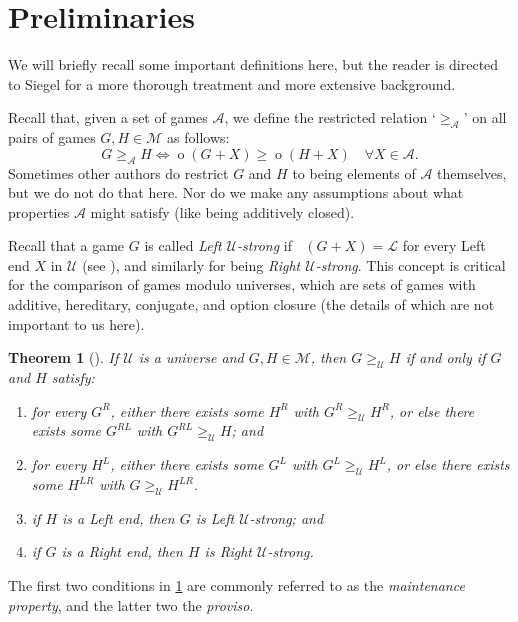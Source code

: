 \documentclass[11pt]{article}
\newtheorem{theorem}{Theorem}[section]
\theoremstyle{definition}
\DeclareMathOperator{\outcome}{o}
\DeclareMathOperator{\outcomeL}{o_L}
\newcommand{\set}[1]{\mathcal{#1}}
\begin{document}
\section{Preliminaries}
\label{sec:prelims}

We will briefly recall some important definitions here, but the reader is
directed to Siegel \cite{siegel:combinatorial} for a more thorough treatment
and more extensive background.

Recall that, given a set of games $\set{A}$, we define the restricted relation
`$\geq_\set{A}$' on all pairs of games $G,H\in\set{M}$ as follows:
\[
    G\geq_\set{A}H\iff\outcome(G+X)\geq\outcome(H+X)\quad\forall X\in\set{A}.
\]
Sometimes other authors do restrict $G$ and $H$ to being elements of $\set{A}$
themselves, but we do not do that here. Nor do we make any assumptions about
what properties $\set{A}$ might satisfy (like being additively closed).

Recall that a game $G$ is called \emph{Left $\set{U}$-strong} if
$\outcomeL(G+X)=\mathscr{L}$ for every Left end $X$ in $\set{U}$ (see
\cite[Definition 2.1 on p.~4]{davies.yadav:invertibility}), and similarly for
being \emph{Right $\set{U}$-strong}. This concept is critical for the
comparison of games modulo universes, which are sets of games with additive,
hereditary, conjugate, and option closure (the details of which are not
important to us here).

\begin{theorem}[{\cite[Theorem 4 on p.~103]{larsson.nowakowski.ea:absolute}}]
    \label{thm:comparison}
    If $\set{U}$ is a universe and $G,H\in\set{M}$, then $G\geq_\set{U}H$ if
    and only if $G$ and $H$ satisfy:
    \begin{enumerate}
        \item
            for every $G^R$, either there exists some $H^R$ with
            $G^R\geq_\set{U} H^R$, or else there exists some $G^{RL}$ with
            $G^{RL}\geq_\set{U}H$; and
        \item
            for every $H^L$, either there exists some $G^L$ with
            $G^L\geq_\set{U}H^L$, or else there exists some $H^{LR}$ with
            $G\geq_\set{U}H^{LR}$.
        \item
            if $H$ is a Left end, then $G$ is Left $\set{U}$-strong; and
        \item
            if $G$ is a Right end, then $H$ is Right $\set{U}$-strong.
    \end{enumerate}
\end{theorem}
The first two conditions in \cref{thm:comparison} are commonly referred to as
the \emph{maintenance property}, and the latter two the \emph{proviso}.
\end{document}
